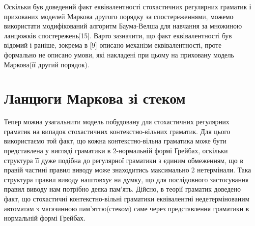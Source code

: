 Оскільки був доведений факт еквівалентності стохастичних регулярних граматик і прихованих моделей Маркова другого порядку за спостереженнями, можемо використати модифікований алгоритм Баума-Велша для навчання за множиною ланцюжків спостережень[15]. Варто зазначити, що факт еквівалентності був відомий і раніше, зокрема в [9] описано механізм еквівалентності, проте формально не описано умови, які накладені при цьому на приховану модель Маркова(її другий порядок).

\section{Ланцюги Маркова зі стеком}
Тепер можна узагальнити модель побудовану для стохастичних регулярних граматик на випадок стохастичних контекстно-вільних граматик. Для цього використаємо той факт, що кожна контекстно-вільна граматика може бути представлена у вигляді граматики в 2-нормальній формі Грейбах, оскільки структура її дуже подібна до регулярної граматики з єдиним обмеженням, що в правій частині правил виводу може знаходитись максимально 2 нетермінали. Така структура правил виводу наштовхує на думку, що для послідовного застосування правил виводу нам потрібно деяка пам'ять. Дійсно, в теорії граматик доведено факт, що стохастичні контекстно-вільні граматики еквівалентні недетермінованим автоматам з магазинною пам'яттю(стеком) саме через представлення граматики в нормальній формі Грейбах.

